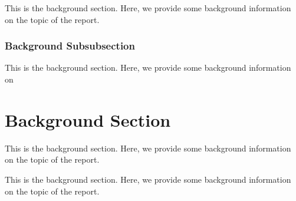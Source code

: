 \documentclass{report}
\begin{document}
This is the background section. Here, we provide some background information on
the topic of the report.
\subsubsection{Background Subsubsection}
This is the background section. Here, we provide some background information on
\section{Background Section}
This is the background section. Here, we provide some background information on
the topic of the report.

This is the background section. Here, we provide some background information on
the topic of the report.
\end{document}
